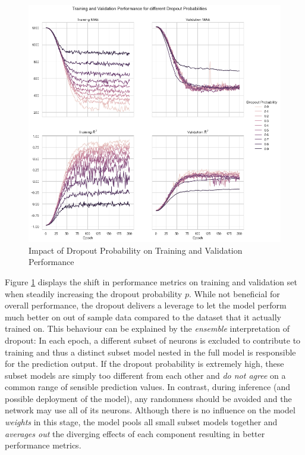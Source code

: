 \documentclass[12pt, letterpaper]{article}
\begin{document}
\begin{figure}[ht]
    \centering
    \includegraphics[width=\textwidth]{dropout_performance.png}
    \caption{Impact of Dropout Probability on Training and Validation Performance}
    \label{fig:dropout}
\end{figure}

Figure \ref{fig:dropout} displays the shift in performance metrics on training and validation set when steadily increasing the dropout probability $p$.
While not beneficial for overall performance, the dropout delivers a leverage to let the model perform much better on out of sample data compared to the dataset that it actually trained on.
This behaviour can be explained by the \emph{ensemble} interpretation of dropout:
In each epoch, a different subset of neurons is excluded to contribute to training and thus a distinct subset model nested in the full model is responsible for the prediction output.
If the dropout probability is extremely high, these subset models are simply too different from each other and \emph{do not agree} on a common range of sensible prediction values.
In contrast, during inference (and possible deployment of the model), any randomness should be avoided and the network may use all of its neurons.
Although there is no influence on the model \emph{weights} in this stage, the model pools all small subset models together and \emph{averages out} the diverging effects of each component resulting in better performance metrics.
\end{document}
